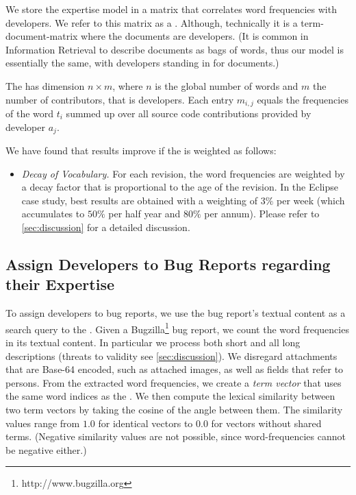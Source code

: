 We store the expertise model in a matrix that correlates word frequencies with developers. We refer to this matrix as a \TAM. Although, technically it is a term-document-matrix where the documents are developers. (It is common in Information Retrieval to describe documents as bags of words, thus our model is essentially the same, with developers standing in for documents.)

The \TAM has dimension $n \times m$, where $n$ is the global number of words and $m$ the number of contributors, that is developers. Each entry $m_{i,j}$ equals the frequencies of the word $t_i$ summed up over all source code contributions provided by developer $a_j$.

We have found that results improve if the \TAM is weighted as follows:

\begin{itemize}
\item \emph{Decay of Vocabulary.} For each revision, the word frequencies are weighted by a decay factor that is proportional to the age of the revision. In the Eclipse case study, best results are obtained with a weighting of $3\%$ per week (which accumulates to $50\%$ per half year and $80\%$ per annum). Please refer to \autoref{sec:discussion} for a detailed discussion.
\end{itemize}

\subsection{Assign Developers to Bug Reports regarding their Expertise}

To assign developers to bug reports, we use the bug report's textual content as a search query to the \TAM.
Given a Bugzilla\footnote{http://www.bugzilla.org} bug report, we count the word frequencies in its textual content. In particular we process both short and all long descriptions (threats to validity see \autoref{sec:discussion}).
We disregard attachments that are Base-64 encoded, such as attached images, as well as fields that refer to persons. From the extracted word frequencies, we create a \emph{term vector} that uses the same word indices as the \TAM. %
We then compute the lexical similarity between two term vectors by taking the cosine of the angle between them.
The similarity values range from $1.0$ for identical vectors to $0.0$ for vectors without shared terms. (Negative similarity values are not possible, since word-frequencies cannot be negative either.)

